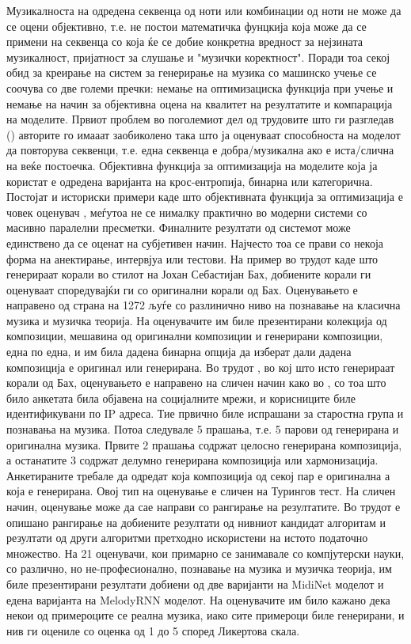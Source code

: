 Музикалноста на одредена секвенца од ноти или комбинации од ноти не може да се оцени објективно, т.е. не постои математичка фунцкија која може да се примени на секвенца со која ќе се добие конкретна вредност за нејзината музикалност, пријатност за слушање и "музички коректност". Поради тоа секој обид за креирање на систем за генерирање на музика со машинско учење се соочува со две големи пречки: немање на оптимизациска функција при учење и немање на начин за објективна оцена на квалитет на резултатите и компарација на моделите. 
Првиот проблем во поголемиот дел од трудовите што ги разгледав (\cite{Tikhonov2017,Boulanger-Lewandowski2012,Boulanger-Lewandowski2014,Liang2017,Johnson2017,Yang2017,Eck2002,Goel2014}) авторите го имааат заобиколено така што ја оценуваат способноста на моделот да повторува секвенци, т.е. една секвенца е добра/музикална ако е иста/слична на веќе постоечка. Објективна функција за оптимизација на моделите која ја користат е одредена варијанта на крос-ентропија, бинарна или категорична. Постојат и историски примери каде што објективната функција за оптимизација е човек оценувач \cite{Biles1994}, меѓутоа не се нималку практично во модерни системи со масивно паралелни пресметки.
Финалните резултати од системот може единствено да се оценат на субјетивен начин. Најчесто тоа се прави со некоја форма на анектирање, интервјуа или тестови. На пример во трудот \cite{Hadjeres2016} каде што генерираат корали во стилот на Јохан Себастијан Бах, добиените корали ги оценуваат споредувајќи ги со оригинални корали од Бах. Оценувањето е направено од страна на 1272 љуѓе со разлинично ниво на познавање на класична музика и музичка теорија. На оценувачите им биле презентирани колекција од композиции, мешавина од оригинални композиции и генерирани композиции, една по една, и им била дадена бинарна опција да изберат дали дадена композиција е оригинал или генерирана.
Во трудот \cite{Liang2017}, во кој што исто генерираат корали од Бах, оценувањето е направено на сличен начин како во \cite{Hadjeres2016}, со тоа што било анкетата била објавена на социјалните мрежи, и корисниците биле идентификувани по IP адреса. Тие првично биле испрашани за старостна група и познавања на музика. Потоа следувале 5 прашања, т.е. 5 парови од генерирана и оригинална музика. Првите 2 прашања содржат целосно генерирана композиција, а останатите 3 содржат делумно генерирана композиција или хармонизација. Анкетираните требале да одредат која композиција од секој пар е оригинална а која е генерирана.
Овој тип на оценување е сличен на Турингов тест. На сличен начин, оценување може да сае направи со рангирање на резултатите. Во трудот \cite{Yang2017} е опишано рангирање на добиените резултати од нивниот кандидат алгоритам и резултати од други алгоритми претходно искористени на истото податочно множество. На 21 оценувачи, кои примарно се занимавале со компјутерски науки, со различно, но не-професионално, познавање на музика и музичка теорија, им биле презентирани резултати добиени од две варијанти на MidiNet моделот и едена варијанта на MelodyRNN моделот. На оценувачите им било кажано дека некои од примероците се реална музика, иако сите примероци биле генерирани, и нив ги оцениле со оценка од 1 до 5 според Ликертова скала.
